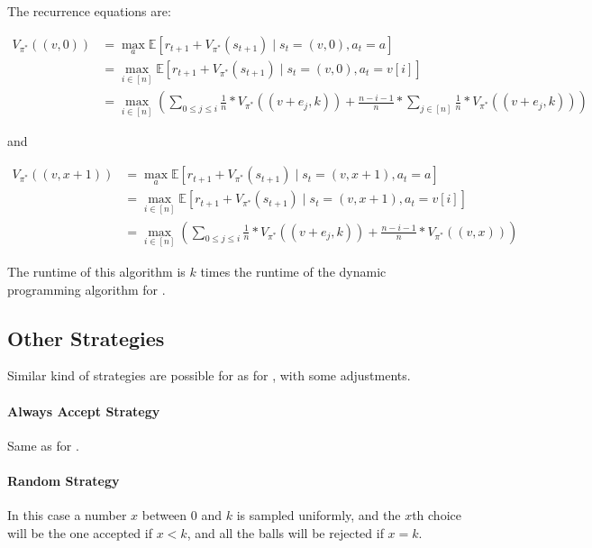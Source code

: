 The recurrence equations are: 

\begin{equation} \label{eq:kthinning-dynamicprogramming-0left}
\begin{split}
    V_{\pi^*}((v, 0)) &= \max_a \mathbb{E} [r_{t+1} + V_{\pi^*}(s_{t+1}) \mid s_t=(v,0), a_t=a] \\
    &= \max_{i \in [n]} \mathbb{E} [r_{t+1} + V_{\pi^*}(s_{t+1}) \mid s_t=(v,0), a_t=v[i]] \\
    &= \max_{i \in [n]} (\sum_{0\leq j \leq i} \frac{1}{n}*V_{\pi^*}((v+e_j,k)) + \frac{n-i-1}{n} * \sum_{j \in [n]} \frac{1}{n}*V_{\pi^*}((v+e_j,k)))
\end{split}
\end{equation}

and 

\begin{equation} \label{eq:kthinning-dynamicprogramming-xleft}
\begin{split}
    V_{\pi^*}((v, x+1)) &= \max_a \mathbb{E} [r_{t+1} + V_{\pi^*}(s_{t+1}) \mid s_t=(v,x+1), a_t=a] \\
    &= \max_{i \in [n]} \mathbb{E} [r_{t+1} + V_{\pi^*}(s_{t+1}) \mid s_t=(v, x+1), a_t=v[i]] \\
    &= \max_{i \in [n]} (\sum_{0\leq j \leq i} \frac{1}{n}*V_{\pi^*}((v+e_j,k)) + \frac{n-i-1}{n} * V_{\pi^*}((v, x)))
\end{split}
\end{equation}

The runtime of this algorithm is $k$ times the runtime of the dynamic programming algorithm for \TwoThinning.


\subsection{Other Strategies}

Similar kind of strategies are possible for \KThinning as for \TwoThinning, with some adjustments.

\paragraph{Always Accept Strategy} Same as for \TwoThinning.


\paragraph{Random Strategy} In this case a number $x$ between $0$ and $k$ is sampled uniformly, and the $x$th choice will be the one accepted if $x<k$, and all the balls will be rejected if $x=k$.



